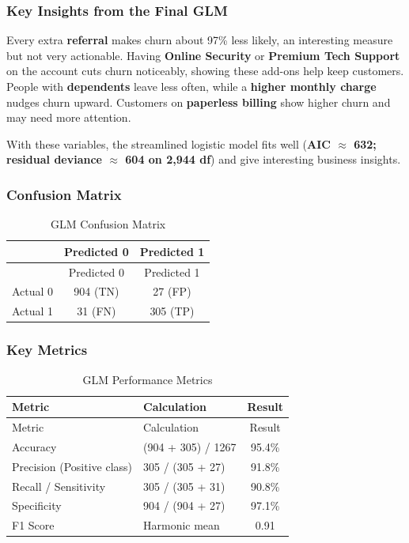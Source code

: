 \documentclass[
]{article}
\begin{document}
\hypertarget{key-insights-from-the-final-glm}{%
\subsubsection{Key Insights from the Final
GLM}\label{key-insights-from-the-final-glm}}

Every extra \textbf{referral} makes churn about 97\% less likely, an
interesting measure but not very actionable. Having \textbf{Online
Security} or \textbf{Premium Tech Support} on the account cuts churn
noticeably, showing these add-ons help keep customers. People with
\textbf{dependents} leave less often, while a \textbf{higher monthly
charge} nudges churn upward. Customers on \textbf{paperless billing}
show higher churn and may need more attention.

With these variables, the streamlined logistic model fits well
(\textbf{AIC \(\approx\) 632; residual deviance \(\approx\) 604 on 2,944
df}) and give interesting business insights.

\hypertarget{confusion-matrix}{%
\subsubsection{Confusion Matrix}\label{confusion-matrix}}

\begin{longtable}[]{@{}lcc@{}}
\caption{GLM Confusion Matrix}\tabularnewline
\toprule\noalign{}
& Predicted 0 & Predicted 1 \\
\midrule\noalign{}
\endfirsthead
\toprule\noalign{}
& Predicted 0 & Predicted 1 \\
\midrule\noalign{}
\endhead
\bottomrule\noalign{}
\endlastfoot
Actual 0 & 904 (TN) & 27 (FP) \\
Actual 1 & 31 (FN) & 305 (TP) \\
\end{longtable}

\hypertarget{key-metrics}{%
\subsubsection{Key Metrics}\label{key-metrics}}

\begin{longtable}[]{@{}llc@{}}
\caption{GLM Performance Metrics}\tabularnewline
\toprule\noalign{}
Metric & Calculation & Result \\
\midrule\noalign{}
\endfirsthead
\toprule\noalign{}
Metric & Calculation & Result \\
\midrule\noalign{}
\endhead
\bottomrule\noalign{}
\endlastfoot
Accuracy & (904 + 305) / 1267 & 95.4\% \\
Precision (Positive class) & 305 / (305 + 27) & 91.8\% \\
Recall / Sensitivity & 305 / (305 + 31) & 90.8\% \\
Specificity & 904 / (904 + 27) & 97.1\% \\
F1 Score & Harmonic mean & 0.91 \\
\end{longtable}
\end{document}
